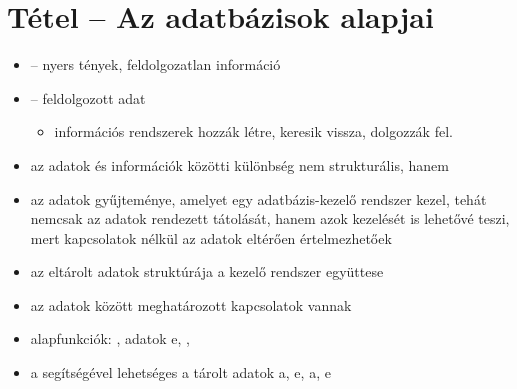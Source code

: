 \documentclass[main.tex]{subfiles}
\begin{document}
  \section{Tétel – Az adatbázisok alapjai} %
    
  \begin{itemize}
    \item {} – nyers tények, feldolgozatlan információ
    
    \item {} – feldolgozott adat
    \begin{itemize}
      \item információs rendszerek hozzák létre,
      keresik vissza, dolgozzák fel.
    \end{itemize}

    \item az adatok és információk közötti különbség
    nem strukturális, hanem 
    
    \item az  adatok gyűjteménye,
    amelyet egy adatbázis-kezelő rendszer kezel, tehát
    nemcsak az adatok rendezett tátolását, hanem azok
    kezelését is lehetővé teszi, mert kapcsolatok nélkül
    az adatok eltérően értelmezhetőek

    \item az eltárolt adatok struktúrája a
    kezelő rendszer együttese

    \item az adatok között meghatározott kapcsolatok vannak
    
    \item alapfunkciók: , adatok e,
    , 

    \item a  segítségével lehetséges a tárolt adatok
    a, e,
    a, e
  \end{itemize}
\end{document}
